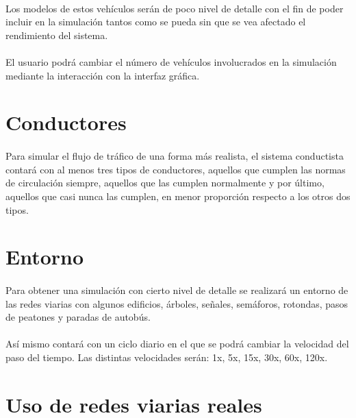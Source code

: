 	\paragraph{}
	Los modelos de estos vehículos serán de poco nivel de detalle con el fin de poder incluir en la simulación tantos como se pueda sin que se vea afectado el rendimiento del sistema.
	
	\paragraph{}
	El usuario podrá cambiar el número de vehículos involucrados en la simulación mediante la interacción con la interfaz gráfica.
	
\section{Conductores}

	\paragraph{}
	Para simular el flujo de tráfico de una forma más realista, el sistema conductista contará con al menos tres tipos de conductores, aquellos que cumplen las normas de circulación siempre, aquellos que las cumplen normalmente y por último, aquellos que casi nunca las cumplen, en menor proporción respecto a los otros dos tipos.
	
\section{Entorno}
	
	\paragraph{}
	Para obtener una simulación con cierto nivel de detalle se realizará un entorno de las redes viarias con algunos edificios, árboles, señales, semáforos, rotondas, pasos de peatones y paradas de autobús.
	
	\paragraph{}
	Así mismo contará con un ciclo diario en el que se podrá cambiar la velocidad del paso del tiempo. Las distintas velocidades serán: 1x, 5x, 15x, 30x, 60x, 120x.
	
\section{Uso de redes viarias reales}

	\paragraph{}
	